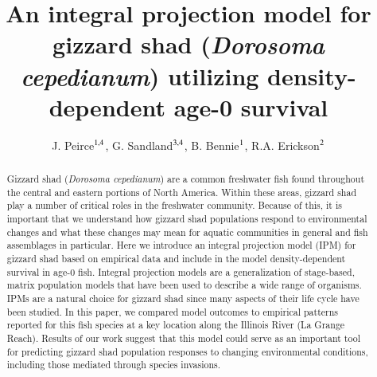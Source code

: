 \documentclass[preprint,review,12pt,authoryear]{elsarticle}
\begin{document}
\linenumbers
\begin{frontmatter}


\title{An integral projection model for gizzard shad (\emph{Dorosoma cepedianum}) utilizing density-dependent age-0 survival}

\author{ J. Peirce$^{\rm 1,4}$,  G.  Sandland$^{\rm 3,4}$, B. Bennie$^{\rm 1}$, R.A. Erickson$^{\rm 2}$}
\address{
${\rm 1}$ University of Wisconsin - La Crosse, Mathematics \& Statistics Department\\ 
${\rm 2}$ U.S.G.S. Upper Mississippi Environmental Science Center\\ 
${\rm 3}$ University of Wisconsin - La Crosse, Biology Department\\
${\rm 4}$ River Studies Center} 

\begin{abstract}
Gizzard shad (\emph{Dorosoma cepedianum}) are a common freshwater fish found throughout the central and eastern portions of North America. 
Within these areas, gizzard shad play a number of critical roles in the freshwater community. 
Because of this, it is important that we understand how gizzard shad populations respond to environmental changes and what these changes may mean for aquatic communities in general and fish assemblages in particular. 
Here we introduce an integral projection model (IPM) for gizzard shad based on empirical data and include in the model density-dependent survival in age-0 fish. 
Integral projection models are a generalization of stage-based, matrix population models that have been used to describe a wide range of organisms. 
IPMs are a natural choice for gizzard shad since many aspects of their life cycle have been studied. 
In this paper, we compared model outcomes to empirical patterns reported for this fish species at a key location along the Illinois River (La Grange Reach). 
Results of our work suggest that this model could serve as an important tool for predicting gizzard shad population responses to changing environmental conditions, including those mediated through species invasions.
\end{abstract}

\begin{graphicalabstract}
\begin{figure}
    \begin{center}
\begin{tikzpicture}[->,>=stealth',shorten >=1pt,auto,node distance=3cm,
  thick,
  main node/.style={rectangle,draw},
  box/.style = {draw=gray, very thick,
                            minimum height=11mm, text width=11mm, 
                            align=center},]
                              

\end{tikzpicture}
\end{center}
\end{figure}
\end{graphicalabstract}
\end{frontmatter}
\end{document}
